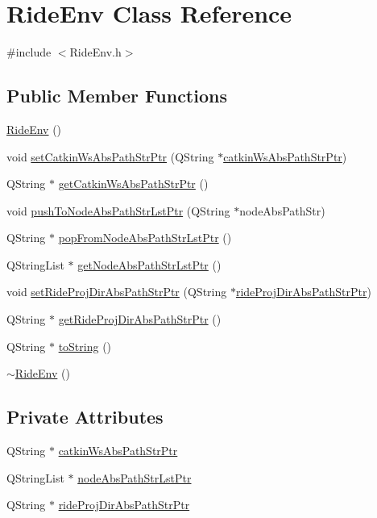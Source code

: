\hypertarget{class_ride_env}{\section{Ride\-Env Class Reference}
\label{class_ride_env}
}


{\ttfamily \#include $<$Ride\-Env.\-h$>$}

\subsection*{Public Member Functions}
\begin{DoxyCompactItemize}
\item 
\hyperlink{class_ride_env_a6229a6564da7aed3bc7f01a8c6d5d30a}{Ride\-Env} ()
\item 
void \hyperlink{class_ride_env_a126b8ac5bc6dd2b0ca109758b1db9bc6}{set\-Catkin\-Ws\-Abs\-Path\-Str\-Ptr} (Q\-String $\ast$\hyperlink{class_ride_env_a3f048e5d036e957c7776f1e31c648b41}{catkin\-Ws\-Abs\-Path\-Str\-Ptr})
\item 
Q\-String $\ast$ \hyperlink{class_ride_env_aefaa312abdea240e659ca8fda26e1977}{get\-Catkin\-Ws\-Abs\-Path\-Str\-Ptr} ()
\item 
void \hyperlink{class_ride_env_aba2d2d0061340150e6246a6c64f319c6}{push\-To\-Node\-Abs\-Path\-Str\-Lst\-Ptr} (Q\-String $\ast$node\-Abs\-Path\-Str)
\item 
Q\-String $\ast$ \hyperlink{class_ride_env_a76e027be4d88b381619e7dd215fbe6e8}{pop\-From\-Node\-Abs\-Path\-Str\-Lst\-Ptr} ()
\item 
Q\-String\-List $\ast$ \hyperlink{class_ride_env_af1c2c75b9cd3cb86cc2dc59f3ad3320d}{get\-Node\-Abs\-Path\-Str\-Lst\-Ptr} ()
\item 
void \hyperlink{class_ride_env_a31d3e3a49c68bf86e3e58951f129ce7c}{set\-Ride\-Proj\-Dir\-Abs\-Path\-Str\-Ptr} (Q\-String $\ast$\hyperlink{class_ride_env_aa809a64cf5c8f8c91cefc2a2c19fd225}{ride\-Proj\-Dir\-Abs\-Path\-Str\-Ptr})
\item 
Q\-String $\ast$ \hyperlink{class_ride_env_ae4f85451f474f68e938caf38959e42f7}{get\-Ride\-Proj\-Dir\-Abs\-Path\-Str\-Ptr} ()
\item 
Q\-String $\ast$ \hyperlink{class_ride_env_a535f35f5a22ea7aa14d902c85745f0a2}{to\-String} ()
\item 
\hyperlink{class_ride_env_ae30c54432b90b1208f5085730fa1ec3d}{$\sim$\-Ride\-Env} ()
\end{DoxyCompactItemize}
\subsection*{Private Attributes}
\begin{DoxyCompactItemize}
\item 
Q\-String $\ast$ \hyperlink{class_ride_env_a3f048e5d036e957c7776f1e31c648b41}{catkin\-Ws\-Abs\-Path\-Str\-Ptr}
\item 
Q\-String\-List $\ast$ \hyperlink{class_ride_env_a5f1bb71c6e9524f2ce403e6b1dd32244}{node\-Abs\-Path\-Str\-Lst\-Ptr}
\item 
Q\-String $\ast$ \hyperlink{class_ride_env_aa809a64cf5c8f8c91cefc2a2c19fd225}{ride\-Proj\-Dir\-Abs\-Path\-Str\-Ptr}
\end{DoxyCompactItemize}


